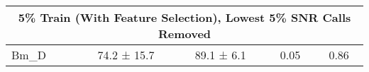 {\begin{table}[]
\begin{tabular}{lcccc}
\multicolumn{5}{c}{5\% Train (With Feature Selection), Lowest 5\% SNR Calls Removed} \\ \hline 
Bm\_D  & 74.2 ± 15.7 & 89.1 ± 6.1  & 0.05 & 0.86 \\ 

\end{tabular}
\end{table}



}
